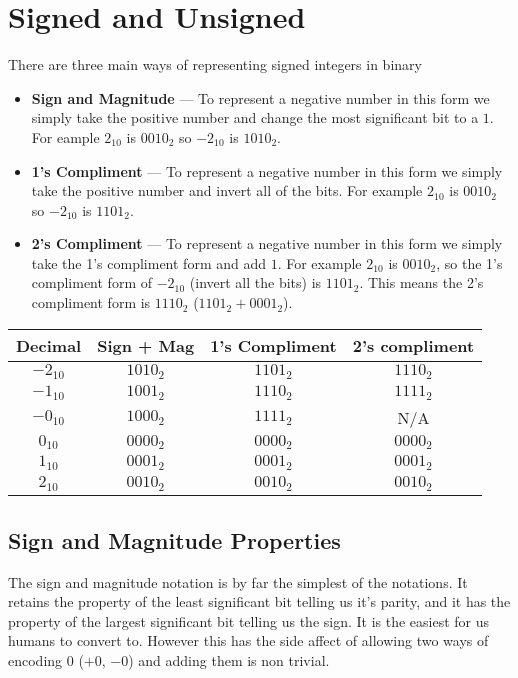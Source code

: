 \documentclass{article}
\begin{document}
\section{Signed and Unsigned}

There are three main ways of representing signed integers in binary

\begin{itemize}
	\item{
		\textbf{Sign and Magnitude} --- To represent a negative number in this form we simply take
		the positive number and change the most significant bit to a $1$. For eample $2_{10}$ is $0010_2$ so
		$-2_{10}$ is $1010_2$.
	}
	\item{
		\textbf{1's Compliment} --- To represent a negative number in this form we simply take the positive number
		and invert all of the bits. For example $2_{10}$ is $0010_2$ so $-2_{10}$ is $1101_2$.
	}
	\item{
		\textbf{2's Compliment} --- To represent a negative number in this form we simply take the 1's compliment form and add $1$.
		For example $2_{10}$ is $0010_2$, so the 1's compliment form of $-2_{10}$ (invert all the bits) is $1101_2$. This means
		the 2's compliment form is $1110_2$ ($1101_2 + 0001_2$).
	}
\end{itemize}

\begin{center}
  \begin{tabular}{ | c | c | c | c | }
    \hline
    Decimal & Sign + Mag & 1's Compliment & 2's compliment \\ \hline
    $-2_{10}$ & $1010_2$ & $1101_2$ & $1110_2$\\ \hline
    $-1_{10}$ & $1001_2$ & $1110_2$ & $1111_2$\\ \hline
    $-0_{10}$ & $1000_2$ & $1111_2$ & N/A\\ \hline
    $0_{10}$ & $0000_2$ & $0000_2$ & $0000_2$\\ \hline
    $1_{10}$ & $0001_2$ & $0001_2$ & $0001_2$\\ \hline
    $2_{10}$ & $0010_2$ & $0010_2$ & $0010_2$ \\
    \hline
  \end{tabular}
\end{center}

\subsection{Sign and Magnitude Properties}
The sign and magnitude notation is by far the simplest of the notations.
It retains the property of the least significant bit telling us it's
parity, and it has the property of the largest significant bit telling us
the sign. It is the easiest for us humans to convert to. However this has the side
affect of allowing two ways of encoding $0$ ($+0$, $-0$) and adding them is non trivial.
\end{document}
